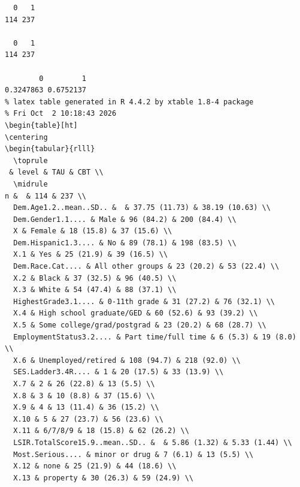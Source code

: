 \documentclass[11pt]{article}\usepackage[]{graphicx}\usepackage[]{xcolor}
\makeatletter
\newenvironment{kframe}{%
 \def\at@end@of@kframe{}%
 \ifinner\ifhmode%
  \def\at@end@of@kframe{\end{minipage}}%
  \begin{minipage}{\columnwidth}%
 \fi\fi%
 \def\FrameCommand##1{\hskip\@totalleftmargin \hskip-\fboxsep
 \colorbox{shadecolor}{##1}\hskip-\fboxsep
     \hskip-\linewidth \hskip-\@totalleftmargin \hskip\columnwidth}%
 \MakeFramed {\advance\hsize-\width
   \@totalleftmargin\z@ \linewidth\hsize
   \@setminipage}}%
 {\par\unskip\endMakeFramed%
 \at@end@of@kframe}
\newenvironment{knitrout}{}{} %
\makeatother
\begin{document}
\begin{knitrout}
\begin{kframe}
\begin{verbatim}
  0   1 
114 237 

  0   1 
114 237 

        0         1 
0.3247863 0.6752137 
% latex table generated in R 4.4.2 by xtable 1.8-4 package
% Fri Oct  2 10:18:43 2026
\begin{table}[ht]
\centering
\begin{tabular}{rlll}
  \toprule
 & level & TAU & CBT \\ 
  \midrule
n &  & 114 & 237 \\ 
  Dem.Age1.2..mean..SD.. &  & 37.75 (11.73) & 38.19 (10.63) \\ 
  Dem.Gender1.1.... & Male & 96 (84.2) & 200 (84.4) \\ 
  X & Female & 18 (15.8) & 37 (15.6) \\ 
  Dem.Hispanic1.3.... & No & 89 (78.1) & 198 (83.5) \\ 
  X.1 & Yes & 25 (21.9) & 39 (16.5) \\ 
  Dem.Race.Cat.... & All other groups & 23 (20.2) & 53 (22.4) \\ 
  X.2 & Black & 37 (32.5) & 96 (40.5) \\ 
  X.3 & White & 54 (47.4) & 88 (37.1) \\ 
  HighestGrade3.1.... & 0-11th grade & 31 (27.2) & 76 (32.1) \\ 
  X.4 & High school graduate/GED & 60 (52.6) & 93 (39.2) \\ 
  X.5 & Some college/grad/postgrad & 23 (20.2) & 68 (28.7) \\ 
  EmploymentStatus3.2.... & Part time/full time & 6 (5.3) & 19 (8.0) \\ 
  X.6 & Unemployed/retired & 108 (94.7) & 218 (92.0) \\ 
  SES.Ladder3.4R.... & 1 & 20 (17.5) & 33 (13.9) \\ 
  X.7 & 2 & 26 (22.8) & 13 (5.5) \\ 
  X.8 & 3 & 10 (8.8) & 37 (15.6) \\ 
  X.9 & 4 & 13 (11.4) & 36 (15.2) \\ 
  X.10 & 5 & 27 (23.7) & 56 (23.6) \\ 
  X.11 & 6/7/8/9 & 18 (15.8) & 62 (26.2) \\ 
  LSIR.TotalScore15.9..mean..SD.. &  & 5.86 (1.32) & 5.33 (1.44) \\ 
  Most.Serious.... & minor or drug & 7 (6.1) & 13 (5.5) \\ 
  X.12 & none & 25 (21.9) & 44 (18.6) \\ 
  X.13 & property & 30 (26.3) & 59 (24.9) \\ 

\end{verbatim}
\end{kframe}
\end{knitrout}
\end{document}
